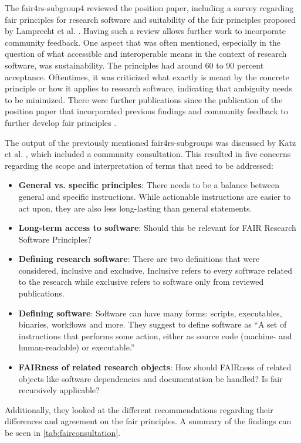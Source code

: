 The \acrshort{fair4rs}-subgroup4 reviewed the position paper, including a survey regarding \acrshort{fair} principles for research software and suitability of the \acrshort{fair} principles proposed by Lamprecht et al. \cite{chue_hong_what_2021}. Having such a review allows further work to incorporate community feedback. One aspect that was often mentioned, especially in the question of what accessible and interoperable means in the context of research software, was sustainability. The principles had around 60 to 90 percent acceptance. Oftentimes, it was criticized what exactly is meant by the concrete principle or how it applies to research software, indicating that ambiguity needs to be minimized. There were further publications since the publication of the position paper that incorporated previous findings and community feedback to further develop \acrshort{fair} principles \cite{katz_fresh_2021, chue_hong_fair_2021, chue_hong_fair_2022}. 



The output of the previously mentioned \acrshort{fair4rs}-subgroups was discussed by Katz et al. \cite{katz_fair4rs_2021-1}, which included a community consultation. This resulted in five concerns regarding the scope and interpretation of terms that need to be addressed:
\begin{itemize}
    \item \textbf{General vs. specific principles}: There needs to be a balance between general and specific instructions. While actionable instructions are easier to act upon, they are also less long-lasting than general statements.
    \item \textbf{Long-term access to software}: Should this be relevant for FAIR Research Software Principles?
    \item \textbf{Defining research software}: There are two definitions that were considered, inclusive and exclusive. Inclusive refers to every software related to the research while exclusive refers to software only from reviewed publications.
    \item \textbf{Defining software}: Software can have many forms: scripts, executables, binaries, workflows and more. They suggest to define software as “A set of instructions that performs some action, either as source code (machine- and human-readable) or executable.”
    \item \textbf{FAIRness of related research objects}: How should FAIRness of related objects like software dependencies and documentation be handled? Is \acrshort{fair} recursively applicable?
\end{itemize}
Additionally, they looked at the different recommendations \cite{lamprecht_towards_2020, noauthor_fair_nodate, katz_fresh_2021} regarding their differences and agreement on the \acrshort{fair} principles. A summary of the findings can be seen in \autoref{tab:fairconsultation}.

